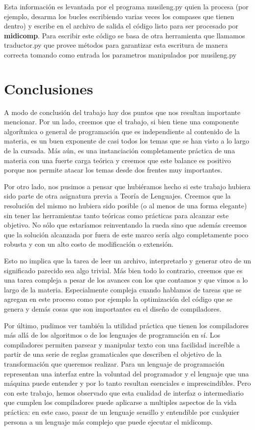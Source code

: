 Esta información es levantada por el programa musileng.py quien la procesa (por ejemplo, desarma los bucles escribiendo varias veces los compases que tienen dentro) y escribe en el archivo de salida el código listo para ser procesado por \textbf{midicomp}. Para escribir este código se basa de otra herramienta que llamamos traductor.py que provee métodos para garantizar esta escritura de manera correcta tomando como entrada los parametros manipulados por musileng.py

\section{Conclusiones}

A modo de conclusión del trabajo hay dos puntos que nos resultan importante mencionar. Por un lado, creemos que el trabajo, si bien
tiene una componente algorítmica o general de programación que es independiente al contenido de la materia, es un buen exponente
de casi todos los temas que se han visto a lo largo de la cursada. Más aún, es una instanciación completamente práctica de una
materia con una fuerte carga teórica y creemos que este balance es positivo porque nos permite atacar los temas desde dos
frentes muy importantes.

Por otro lado, nos pusimos a pensar que hubiéramos hecho si este trabajo hubiera sido parte de otra asignatura previa a 
Teoría de Lenguajes. Creemos que la resolución del mismo no hubiera sido posible (o al menos de una forma elegante) sin
tener las herramientas tanto teóricas como prácticas para alcanzar este objetivo. No sólo que estaríamos reinventando la rueda
sino que además creemos que la solución alcanzada por fuera de este marco sería algo completamente poco robusta y 
con un alto costo de modificación o extensión.

Esto no implica que la tarea de leer un archivo, interpretarlo y generar otro de un significado parecido sea algo trivial.
Más bien todo lo contrario, creemos que es una tarea compleja a pesar de los avances con los que contamos y que 
vimos a lo largo de la materia. Especialmente compleja cuando hablamos de tareas que se agregan en este proceso como
por ejemplo la optimización del código que se genera y demás cosas que son importantes en el diseño de compiladores.

Por último, pudimos ver también la utilidad práctica que tienen los compiladores más allá de los algoritmos o de los lenguajes de programación en sí. Los compiladores permiten parsear y manipular texto con una facilidad increíble a partir de una serie de reglas gramaticales que describen el objetivo de la transformación que queremos realizar. Para un lenguaje de programación representan una interfaz entre la voluntad del programador y el lenguaje que una máquina puede entender y por lo tanto resultan esenciales e imprescindibles. Pero con este trabajo, hemos observado que esta cualidad de interfaz o intermediario que cumplen los compiladores puede aplicarse a multiples aspectos de la vida práctica: en este caso, pasar de un lenguaje sensillo y entendible por cualquier persona a un lenguaje más complejo que puede ejecutar el midicomp.